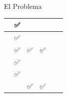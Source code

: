 \documentclass[10pt]{beamer}
\begin{document}
\begin{frame}{El Problema}
\begin{table}
\begin{tabular}{| c c c c c c |}
          \cite{gomesenergy2016}       &       ✅       &               &       &               &               \\ \hline
          \cite{gomesnosql-based2023}  &       ✅       &               &       &               &               \\ \hline
          \cite{guoenergy2024}         &       ✅       &       ✅      &  ✅   &               &               \\ \hline
          \cite{subramaniamenergy2015} &       ✅       &               &       &               &               \\ \hline
          \cite{niemanntowards2016}    &       ✅       &               &       &               &               \\ \hline
          \cite{roukhenergy-aware2016} &                &       ✅      &  ✅   &               &               \\ \hline
        \end{tabular}
      \end{table}
    \end{frame}
\end{document}
